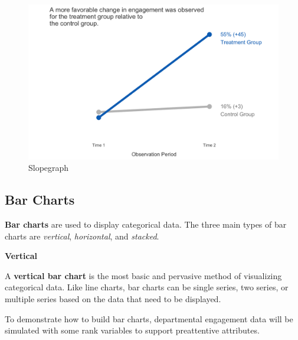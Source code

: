 \documentclass[
]{book}
\begin{document}
\begin{figure}

{\centering \includegraphics[width=1\linewidth]{graphics/slopegraph} 

}

\caption{Slopegraph}\label{fig:slopegraph}
\end{figure}

\hypertarget{bar-charts}{%
\subsection{Bar Charts}\label{bar-charts}}

\textbf{Bar charts} are used to display categorical data. The three main types of bar charts are \emph{vertical}, \emph{horizontal}, and \emph{stacked}.

\textbf{Vertical}

A \textbf{vertical bar chart} is the most basic and pervasive method of visualizing categorical data. Like line charts, bar charts can be single series, two series, or multiple series based on the data that need to be displayed.

To demonstrate how to build bar charts, departmental engagement data will be simulated with some rank variables to support preattentive attributes.
\end{document}

